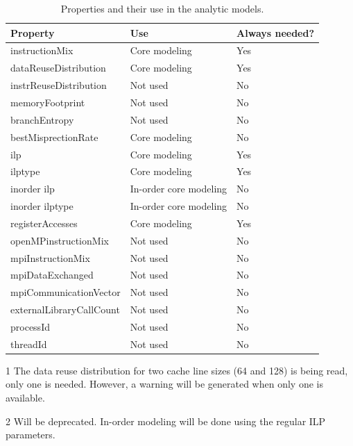 \begin{table}
  \centering
  \small
  \caption{Properties and their use in the analytic models.}
  \label{tbl:200:properties}
  \begin{threeparttable}
    \begin{tabular}{lll}
    	\toprule
      \textbf{Property} & \textbf{Use} & \textbf{Always needed?} \\
      \midrule
      instructionMix & Core modeling & Yes \\
      dataReuseDistribution\tnote{1} & Core modeling & Yes \\
      instrReuseDistribution & Not used & No \\
      memoryFootprint & Not used & No \\
      branchEntropy & Not used & No \\
      bestMisprectionRate & Core modeling & No \\
      ilp & Core modeling & Yes \\
      ilptype & Core modeling & Yes \\
      inorder ilp\tnote{2} & In-order core modeling & No \\
      inorder ilptype\tnote{2} & In-order core modeling & No \\
      registerAccesses & Core modeling & Yes \\
      openMPinstructionMix & Not used & No \\
      mpiInstructionMix & Not used & No \\
      mpiDataExchanged & Not used & No \\
      mpiCommunicationVector & Not used & No \\
      externalLibraryCallCount & Not used & No \\
      processId & Not used & No \\
      threadId & Not used & No \\
      \bottomrule
    \end{tabular}
    \begin{tablenotes}
      \item[1] The data reuse distribution for two cache line sizes (64 and 128) is being read, only one is needed. However, a warning will be generated when only one is available.
      \item[2] Will be deprecated. In-order modeling will be done using the regular ILP parameters.
    \end{tablenotes}
  \end{threeparttable}
\end{table}

